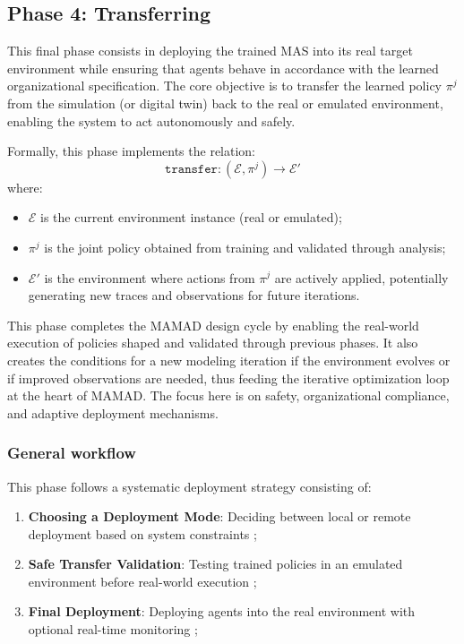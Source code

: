 \documentclass[pdflatex,sn-mathphys-num]{sn-jnl}%
\theoremstyle{thmstyleone}%
\theoremstyle{thmstyletwo}%
\theoremstyle{thmstylethree}%
\begin{document}
\subsection{Phase 4: Transferring}

This final phase consists in deploying the trained MAS into its real target environment while ensuring that agents behave in accordance with the learned organizational specification. The core objective is to transfer the learned policy $\pi^j$ from the simulation (or digital twin) back to the real or emulated environment, enabling the system to act autonomously and safely.

Formally, this phase implements the relation:
\[
    \texttt{transfer}: \left( \mathcal{E}, \pi^j \right) \longrightarrow \mathcal{E}'
\]
where:
\begin{itemize}
    \item $\mathcal{E}$ is the current environment instance (real or emulated);
    \item $\pi^j$ is the joint policy obtained from training and validated through analysis;
    \item $\mathcal{E}'$ is the environment where actions from $\pi^j$ are actively applied, potentially generating new traces and observations for future iterations.
\end{itemize}

This phase completes the MAMAD design cycle by enabling the real-world execution of policies shaped and validated through previous phases. It also creates the conditions for a new modeling iteration if the environment evolves or if improved observations are needed, thus feeding the iterative optimization loop at the heart of MAMAD. The focus here is on safety, organizational compliance, and adaptive deployment mechanisms.


\subsubsection{General workflow}
This phase follows a systematic deployment strategy consisting of:
\begin{enumerate}
    \item \textbf{Choosing a Deployment Mode}: Deciding between local or remote deployment based on system constraints ;
    \item \textbf{Safe Transfer Validation}: Testing trained policies in an emulated environment before real-world execution ;
    \item \textbf{Final Deployment}: Deploying agents into the real environment with optional real-time monitoring ;
\end{enumerate}
\end{document}
